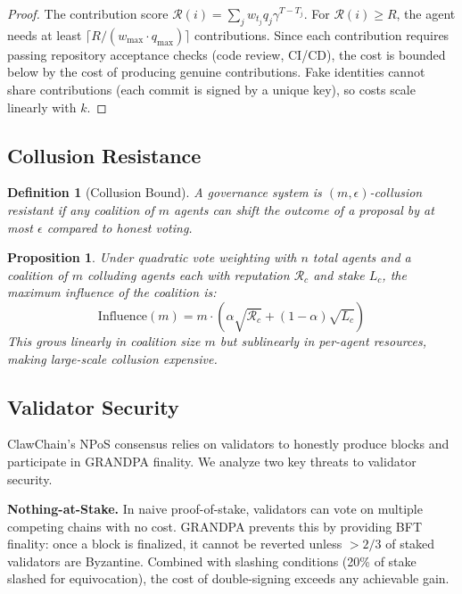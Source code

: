 \documentclass[conference]{IEEEtran}
\newtheorem{proposition}[theorem]{Proposition}
\newtheorem{definition}{Definition}
\begin{document}
\begin{proof}
The contribution score $\mathcal{R}(i) = \sum_j w_{t_j} q_j \gamma^{T-T_j}$. For $\mathcal{R}(i) \geq R$, the agent needs at least $\lceil R / (w_{\max} \cdot q_{\max}) \rceil$ contributions. Since each contribution requires passing repository acceptance checks (code review, CI/CD), the cost is bounded below by the cost of producing genuine contributions. Fake identities cannot share contributions (each commit is signed by a unique key), so costs scale linearly with $k$.
\end{proof}

\subsection{Collusion Resistance}

\begin{definition}[Collusion Bound]
A governance system is $(m, \epsilon)$-collusion resistant if any coalition of $m$ agents can shift the outcome of a proposal by at most $\epsilon$ compared to honest voting.
\end{definition}

\begin{proposition}
Under quadratic vote weighting with $n$ total agents and a coalition of $m$ colluding agents each with reputation $\mathcal{R}_c$ and stake $L_c$, the maximum influence of the coalition is:
\begin{equation}
    \text{Influence}(m) = m \cdot (\alpha\sqrt{\mathcal{R}_c} + (1-\alpha)\sqrt{L_c})
\end{equation}
This grows linearly in coalition size $m$ but sublinearly in per-agent resources, making large-scale collusion expensive.
\end{proposition}

\subsection{Validator Security}

ClawChain's NPoS consensus relies on validators to honestly produce blocks and participate in GRANDPA finality. We analyze two key threats to validator security.

\textbf{Nothing-at-Stake.} In naive proof-of-stake, validators can vote on multiple competing chains with no cost. GRANDPA prevents this by providing BFT finality: once a block is finalized, it cannot be reverted unless $>2/3$ of staked validators are Byzantine. Combined with slashing conditions (20\% of stake slashed for equivocation), the cost of double-signing exceeds any achievable gain.
\end{document}
